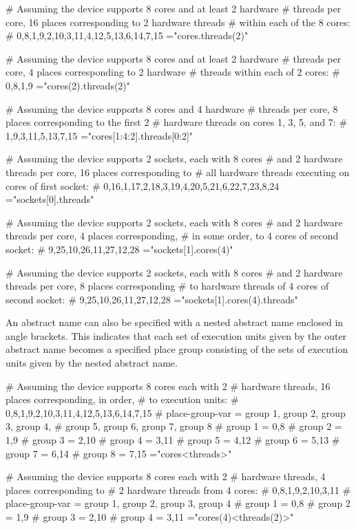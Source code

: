 \begin{boxeducode}
# Assuming the device supports 8 cores and at least 2 hardware
# threads per core, 16 places corresponding to 2 hardware threads
# within each of the 8 cores:
# 0,8,1,9,2,10,3,11,4,12,5,13,6,14,7,15
="cores.threads(2)"

# Assuming the device supports 8 cores and at least 2 hardware
# threads per core, 4 places corresponding to 2 hardware
# threads within each of 2 cores:
# 0,8,1,9
="cores(2).threads(2)"

# Assuming the device supports 8 cores and 4 hardware
# threads per core, 8 places corresponding to the first 2
# hardware threads on cores 1, 3, 5, and 7:
# 1,9,3,11,5,13,7,15
="cores[1:4:2].threads[0:2]"

# Assuming the device supports 2 sockets, each with 8 cores
# and 2 hardware threads per core, 16 places corresponding to
# all hardware threads executing on cores of first socket:
# 0,16,1,17,2,18,3,19,4,20,5,21,6,22,7,23,8,24
="sockets[0].threads"

# Assuming the device supports 2 sockets, each with 8 cores
# and 2 hardware threads per core, 4 places corresponding,
# in some order, to 4 cores of second socket:
# {9,25},{10,26},{11,27},{12,28}
="sockets[1].cores(4)"

# Assuming the device supports 2 sockets, each with 8 cores
# and 2 hardware threads per core, 8 places corresponding
# to hardware threads of 4 cores of second socket:
# 9,25,10,26,11,27,12,28
="sockets[1].cores(4).threads"
\end{boxeducode}

An abstract name can also be specified with a nested abstract name enclosed in
angle brackets. This indicates that each set of execution units given by the
outer abstract name becomes a specified place group consisting of the sets of
execution units given by the nested abstract name.

\begin{boxeducode}
# Assuming the device supports 8 cores each with 2
# hardware threads, 16 places corresponding, in order,
# to execution units:
# 0,8,1,9,2,10,3,11,4,12,5,13,6,14,7,15
# place-group-var = group 1, group 2, group 3, group 4,
#                   group 5, group 6, group 7, group 8
#         group 1 = 0,8
#         group 2 = 1,9
#         group 3 = 2,10
#         group 4 = 3,11
#         group 5 = 4,12
#         group 6 = 5,13
#         group 7 = 6,14
#         group 8 = 7,15
="cores<threads>"

# Assuming the device supports 8 cores each with 2
# hardware threads, 4 places corresponding to 
# 2 hardware threads from 4 cores:
# 0,8,1,9,2,10,3,11
# place-group-var = group 1, group 2, group 3, group 4
#         group 1 = 0,8
#         group 2 = 1,9
#         group 3 = 2,10
#         group 4 = 3,11
="cores(4)<threads(2)>"
\end{boxeducode}
